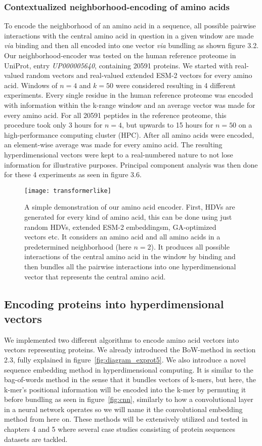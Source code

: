 \subsubsection*{Contextualized neighborhood-encoding of amino acids}
To encode the neighborhood of an amino acid in a sequence, all possible pairwise interactions with the central amino acid in question in a given window are made \textit{via} binding and then all encoded into one vector \textit{via} bundling as shown figure 3.2. Our neighborhood-encoder was tested on the human reference proteome in UniProt, entry \textit{UP000005640}, containing 20591 proteins. We started with real-valued random vectors and real-valued extended ESM-2 vectors for every amino acid. Windows of $n = 4$ and $k = 50$ were considered resulting in 4 different experiments. Every single residue in the human reference proteome was encoded with information within the k-range window and an average vector was made for every amino acid. For all 20591 peptides in the reference proteome, this procedure took only 3 hours for $n = 4$, but upwards to 15 hours for $n = 50$ on a high-performance computing cluster (HPC). After all amino acids were encoded, an element-wise average was made for every amino acid. The resulting hyperdimensional vectors were kept to a real-numbered nature to not lose information for illustrative purposes. Principal component analysis was then done for these 4 experiments as seen in figure 3.6. 

\begin{figure}[H]
    \centering
    \texttt{[image: transformerlike]}
    \caption{A simple demonstration of our amino acid encoder. First, HDVs are generated for every kind of amino acid, this can be done using just random HDVs, extended ESM-2 embeddingsm, GA-optimized vectors etc. It considers an amino acid and all amino acids in a predetermined neighborhood (here $n = 2$). It produces all possible interactions of the central amino acid in the window by binding and then bundles all the pairwise interactions into one hyperdimensional vector that represents the central amino acid.}
    \label{fig:AAtr}
\end{figure}

\subsection*{Encoding proteins into hyperdimensional vectors}
We implemented two different algorithms to encode amino acid vectors into vectors representing proteins. We already introduced the BoW-method in section 2.3, fully explained in figure~\ref{fig:diagram_exprot5}. We also introduce a novel sequence embedding method in hyperdimensional computing.  It is similar to the bag-of-words method in the sense that it bundles vectors of k-mers, but here, the k-mer's positional information will be encoded into the k-mer by permuting it before bundling as seen in figure~\ref{fig:cnn}, similarly to how a convolutional layer in a neural network operates so we will name it the convolutional embedding method from here on. These methods will be extensively utilized and tested in chapters 4 and 5 where several case studies consisting of protein sequences datasets are tackled.

